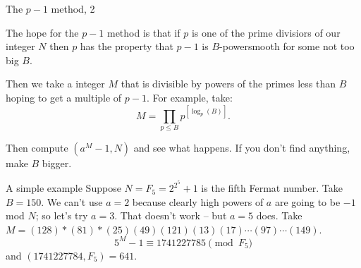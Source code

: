 \documentclass{beamer}
\begin{document}
\begin{frame}{The $p-1$ method, 2}
	
	The hope for the $p-1$ method is that if $p$ is one  of the prime divisiors of our integer $N$ then $p$ has the property that $p-1$ is $B$-powersmooth
	for some not too big $B$. 

	\bigskip\noindent
	Then we take a integer $M$ that is divisible by powers of the primes less than $B$ hoping to get a multiple of $p-1$. 
	For example, take:
	$$
	M=\prod_{p\le B} p^{[\log_{p}(B)]}.
	$$

	\bigskip\noindent
	Then compute $(a^{M}-1,N)$ and see what happens.  If you don't find anything, make $B$ bigger.

\end{frame}
\begin{frame}{A simple example}
	Suppose $N=F_{5}=2^{2^5}+1$ is the fifth Fermat number.  Take $B=150$.  We can't use $a=2$ because clearly high powers of $a$ are going to be 
	$-1$ mod $N$; so let's try $a=3$. That doesn't work -- but $a=5$ does. Take $M=(128)*(81)*(25)(49)(121)(13)(17)\cdots(97)\cdots(149)$.  
	$$
	5^M-1 \equiv 1741227785\pmod{F_{5}}
	$$
	and $(1741227784,F_{5})=641$. 
\end{frame}
\end{document}
